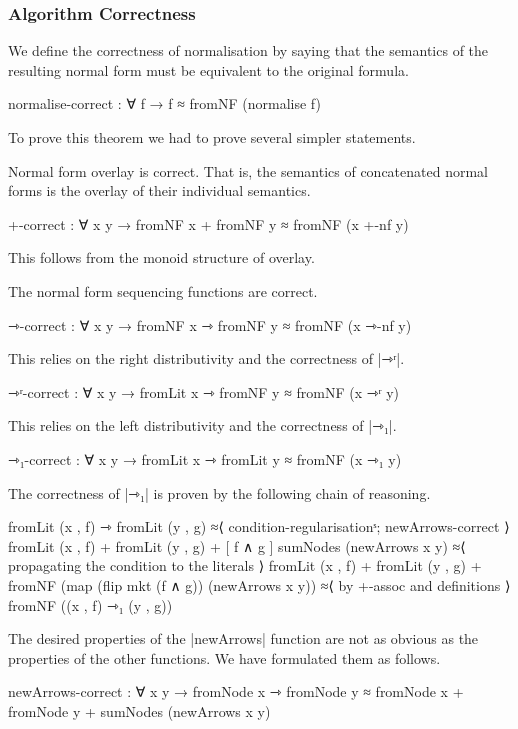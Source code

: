 \subsubsection{Algorithm Correctness}
We define the correctness of normalisation by saying that the semantics of the resulting normal form must be equivalent to the original formula.
\begin{code}
  normalise-correct : ∀ f → f ≈ fromNF (normalise f)
\end{code}

To prove this theorem we had to prove several simpler statements.

Normal form overlay is correct.
That is, the semantics of concatenated normal forms is the overlay of their individual semantics.
\begin{code}
 +-correct : ∀ x y → 
   fromNF x + fromNF y ≈ fromNF (x +-nf y)
\end{code}
This follows from the monoid structure of overlay.

The normal form sequencing functions are correct.
\begin{code}
 ⇾-correct : ∀ x y → 
   fromNF x ⇾ fromNF y ≈ fromNF (x ⇾-nf y)
\end{code}
This relies on the right distributivity and the correctness of |⇾ʳ|.
\begin{code}
 ⇾ʳ-correct : ∀ x y → 
   fromLit x ⇾ fromNF y ≈ fromNF (x ⇾ʳ y)
\end{code}
This relies on the left distributivity and the correctness of |⇾₁|.
\begin{code}
 ⇾₁-correct : ∀ x y → 
   fromLit x ⇾ fromLit y ≈ fromNF (x ⇾₁ y)
\end{code}
The correctness of |⇾₁| is proven by the following chain of reasoning.
\begin{code}
    fromLit (x , f) ⇾ fromLit (y , g)
     ≈⟨ condition-regularisationˢ; newArrows-correct ⟩
    fromLit (x , f) + fromLit (y , g) 
        + [ f ∧ g ] sumNodes (newArrows x y)
     ≈⟨ propagating the condition to the literals ⟩
    fromLit (x , f) + fromLit (y , g) 
       + fromNF (map (flip mkt (f ∧ g)) (newArrows x y))
     ≈⟨ by +-assoc and definitions ⟩
    fromNF ((x , f) ⇾₁ (y , g))
\end{code}
The desired properties of the |newArrows| function are not as obvious as the properties of the other functions. We have formulated them as follows.
\begin{code}
  newArrows-correct : ∀ x y → 
     fromNode x ⇾ fromNode y ≈ 
     fromNode x + fromNode y 
                       + sumNodes (newArrows x y)
\end{code}

